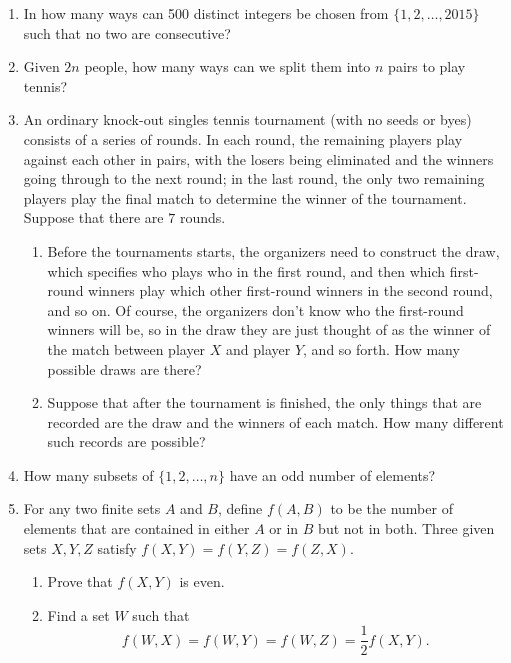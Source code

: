 \documentclass[12pt]{article}
\begin{document}
\begin{enumerate}
	\item In how many ways can 500 distinct integers be chosen from $\{1,2,\dots,2015\}$ such that no two are consecutive?
	\item Given $2n$ people, how many ways can we split them into $n$ pairs to play tennis?
	\item An ordinary knock-out singles tennis tournament (with no seeds or byes) consists of a series of rounds. In each round, the remaining players play against each other in pairs, with the losers being eliminated and the winners going through to the next round; in the last round, the only two remaining players play the final match to determine the winner of the tournament. Suppose that there are $7$ rounds.
	\begin{enumerate}
		\item Before the tournaments starts, the organizers need to construct the draw, which specifies who plays who in the first round, and then which first-round winners play which other first-round winners in the second round, and so on. Of course, the organizers don't know who the first-round winners will be, so in the draw they are just thought of as the winner of the match between player $X$ and player $Y$, and so forth. How many possible draws are there?
		\item Suppose that after the tournament is finished, the only things that are recorded are the draw and the winners of each match. How many different such records are possible?
	\end{enumerate}
	\item How many subsets of $\{1,2,\dots,n\}$ have an odd number of elements?
	\item For any two finite sets $A$ and $B$, define $f(A,B)$ to be the number of elements that are contained in either $A$ or in $B$ but not in both. Three given sets $X,Y,Z$ satisfy $f(X,Y)=f(Y,Z)=f(Z,X)$.
	\begin{enumerate}
		\item Prove that $f(X,Y)$ is even.
		\item Find a set $W$ such that \[f(W,X)=f(W,Y)=f(W,Z)=\frac{1}{2}f(X,Y).\]
	\end{enumerate}
\end{enumerate}
\end{document}
